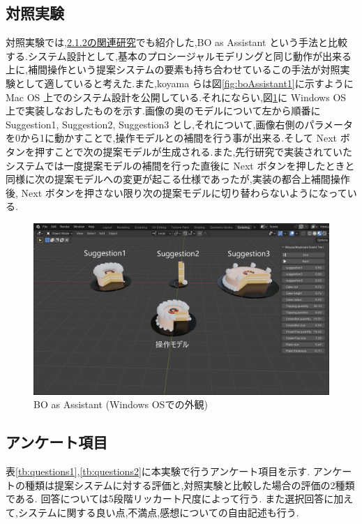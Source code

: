 \clearpage
\newpage

\subsection{対照実験}
対照実験では,\hyperref[label:relatedResearch]{2.1.2の関連研究}でも紹介した,BO as Assistant \cite{koyama2022bo}という手法と比較する.システム設計として,基本のプロシージャルモデリングと同じ動作が出来る上に,補間操作という提案システムの要素も持ち合わせているこの手法が対照実験として適していると考えた.また,koyama らは図\ref{fig:boAssistant1}に示すように Mac OS 上でのシステム設計を公開している.それにならい,図\ref{fig:boAssistant2}に Windows OS 上で実装しなおしたものを示す.画像の奥のモデルについて左から順番に Suggestion1, Suggestion2, Suggestion3 とし,それについて,画像右側のパラメータを0から1に動かすことで,操作モデルとの補間を行う事が出来る.そして Next ボタンを押すことで次の提案モデルが生成される.また,先行研究で実装されていたシステムでは一度提案モデルの補間を行った直後に Next ボタンを押したときと同様に次の提案モデルへの変更が起こる仕様であったが,実装の都合上補間操作後, Next ボタンを押さない限り次の提案モデルに切り替わらないようになっている.
\begin{figure}[h]
	\begin{center}
		\includegraphics[scale=0.2]{./imgs/boAssistant2.png}
		\caption{BO as Assistant (Windows OSでの外観)\label{fig:boAssistant2}}
	\end{center}
\end{figure}
\newpage


\subsection{アンケート項目}
表\ref{tb:questions1},\ref{tb:questions2}に本実験で行うアンケート項目を示す.
アンケートの種類は提案システムに対する評価と,対照実験と比較した場合の評価の2種類である.
回答については5段階リッカート尺度\cite{likert1932technique}によって行う.
また選択回答に加えて,システムに関する良い点,不満点,感想についての自由記述も行う.

